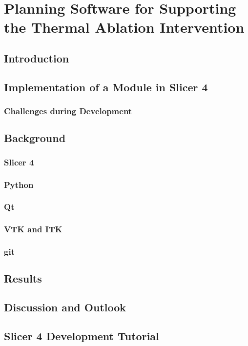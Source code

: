 \chapter{Planning Software for Supporting the Thermal Ablation Intervention}
\section{Introduction}

\section{Implementation of a Module in Slicer 4}
\subsection{Challenges during Development}

\section{Background}
\subsection{Slicer 4}
\subsection{Python}
\subsection{Qt}
\subsection{VTK and ITK}
\subsection{git}

\section{Results}

\section{Discussion and Outlook}

\section{Slicer 4 Development Tutorial}

